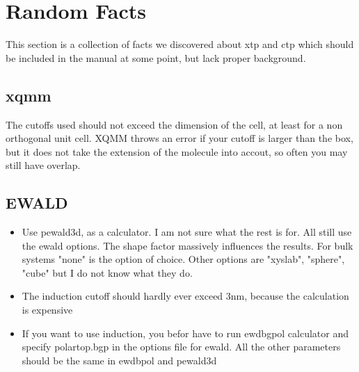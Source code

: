 \section{Random Facts}

This section is a collection of facts we discovered about xtp and ctp which should be included in the manual at some point, but lack proper background.



\subsection{xqmm}

The cutoffs used should not exceed the dimension of the cell, at least for a non orthogonal unit cell. XQMM throws an error if your cutoff is larger than the box, but it does not take the extension of the molecule into accout, so often you may still have overlap.


\subsection{EWALD}


\begin{itemize}
\item Use pewald3d, as a calculator. I am not sure what the rest is for. All still use the ewald options. The shape factor massively influences the results. For bulk systems "none" is the option of choice. Other options are "xyslab", "sphere", "cube" but I do not know what they do.
\item The induction cutoff should hardly ever exceed 3nm, because the calculation is expensive
\item If you want to use induction, you befor have to run ewdbgpol calculator and specify polar\textunderscore top.bgp in the options file for ewald. All the other parameters should be the same in ewdbpol and pewald3d
\end{itemize}
